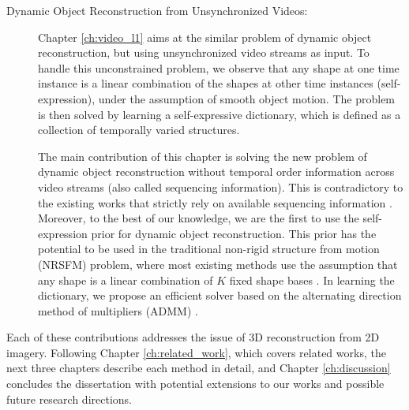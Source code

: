 \begin{description}
\item[Dynamic Object Reconstruction from Unsynchronized Videos:]
Chapter \ref{ch:video_l1} aims at the similar problem of dynamic object reconstruction, but using unsynchronized video streams as input. To handle this unconstrained problem, we observe that any shape at one time instance is a linear combination of the shapes at other time instances (self-expression), under the assumption of smooth object motion. The problem is then solved by learning a self-expressive dictionary, which is defined as a collection of temporally varied structures. 

The main contribution of this chapter is solving the new problem of dynamic object reconstruction without temporal order information across video streams (also called sequencing information). This is contradictory to the existing works that strictly rely on available sequencing information \cite{Park_ECCV2010,Valmadre_CVPR2012}. 
Moreover, to the best of our knowledge, we are the first to use the self-expression prior for dynamic object reconstruction. This prior has the potential to be used in the traditional non-rigid structure from motion (NRSFM) problem, where most existing methods use the assumption that any shape is a linear combination of $K$ fixed shape bases \cite{dai2014simple,Bregler_CVPR2000}. In learning the dictionary, we propose an efficient solver based on the alternating direction method of multipliers (ADMM) \cite{boyd2011distributed}.

\end{description}

Each of these contributions addresses the issue of 3D reconstruction from 2D imagery. Following Chapter \ref{ch:related_work}, which covers related works, the next three chapters describe each method in detail, and Chapter \ref{ch:discussion} concludes the dissertation with potential extensions to our works and possible future research directions. 

